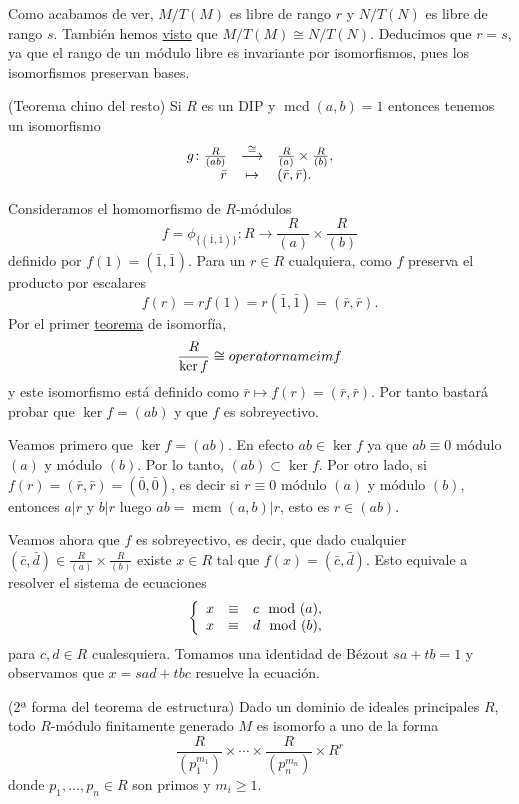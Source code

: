 
Como acabamos de ver, \(M/T(M)\) es libre de rango \(r\) y \(N/T(N)\) es
libre de rango \(s\). También hemos
\protect\hyperlink{torsionquotient}{visto} que \(M/T(M)\cong N/T(N)\).
Deducimos que \(r=s\), ya que el rango de un módulo libre es invariante
por isomorfismos, pues los isomorfismos preservan bases. 

\textrm{\normalfont (Teorema chino del resto)} Si \(R\)
es un DIP y \(\operatorname{mcd}(a,b)=1\) entonces tenemos un
isomorfismo
\[\begin{array}{rcl}g\colon \frac{R}{(ab)}&\stackrel{\cong}\longrightarrow&\frac{R}{(a)}\times \frac{R}{(b)},\cr\bar r&\mapsto &(\bar r,\bar r).\end{array}\]


Consideramos el homomorfismo de \(R\)-módulos
\[f=\phi_{\{(\bar 1,\bar 1)\}}\colon R\longrightarrow\frac{R}{(a)}\times \frac{R}{(b)}\]
definido por \(f(1)=(\bar 1,\bar 1)\). Para un \(r\in R\) cualquiera,
como \(f\) preserva el producto por escalares
\[f( r )=rf(1)=r(\bar 1,\bar 1)=(\bar r,\bar r).\] Por el primer
\protect\hyperlink{isomodules}{teorema} de isomorfía, \[
\frac{R}{\ker f}\cong\\operatorname{im} f
\] y este isomorfismo está definido como
\(\bar r\mapsto f( r )=(\bar r,\bar r)\). Por tanto bastará probar que
\(\ker f=(ab)\) y que \(f\) es sobreyectivo.

Veamos primero que \(\ker f=(ab)\). En efecto \(ab\in\ker f\) ya que
\(ab\equiv 0\) módulo \((a)\) y módulo \((b)\). Por lo tanto,
\((ab)\subset \ker f\). Por otro lado, si
\(f( r )=(\bar r,\bar r)=(\bar 0,\bar 0)\), es decir si \(r\equiv 0\)
módulo \((a)\) y módulo \((b)\), entonces \(a|r\) y \(b|r\) luego
\(ab=\operatorname{mcm}(a,b)|r\), esto es \(r\in (ab)\).

Veamos ahora que \(f\) es sobreyectivo, es decir, que dado cualquier
\((\bar c,\bar d)\in \frac{R}{(a)}\times \frac{R}{(b)}\) existe
\(x\in R\) tal que \(f(x)=(\bar{c},\bar{d})\). Esto equivale a resolver
el sistema de ecuaciones
\[\left\{\begin{array}{rcl}x&\equiv& c\mod (a),\cr x&\equiv& d\mod (b),\end{array}\right.\]
para \(c,d\in R\) cualesquiera. Tomamos una identidad de Bézout
\(sa+tb=1\) y observamos que \(x=sad+tbc\) resuelve la ecuación.

\textrm{\normalfont (2ª forma del teorema de estructura)}
Dado un dominio de ideales principales \(R\), todo \(R\)-módulo
finitamente generado \(M\) es isomorfo a uno de la forma
\[\frac{R}{(p_1^{m_1})}\times \cdots \times\frac{R}{(p_n^{m_n})}\times R^{r}\]
donde \(p_1,\dots,p_n\in R\) son primos y \(m_i\geq 1\).

